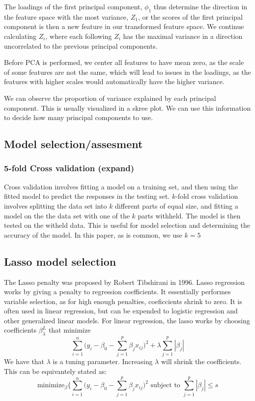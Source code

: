\documentclass[12pt,twoside]{reedthesis}
\theoremstyle{definition}
\theoremstyle{definition}
\theoremstyle{definition}
\theoremstyle{remark}
\begin{document}
The loadings of the first principal component, \(\phi_1\) thus determine
the direction in the feature space with the most variance, \(Z_1\), or
the scores of the first principal component is then a new feature in our
transformed feature space. We continue calculating \(Z_i\), where each
following \(Z_i\) has the maximal variance in a direction uncorrelated
to the previous principal components.

Before PCA is performed, we center all features to have mean zero, as
the scale of some features are not the same, which will lead to issues
in the loadings, as the features with higher scales would automatically
have the higher variance.

We can observe the proportion of variance explained by each principal
component. This is usually visualized in a skree plot. We can use this
information to decide how many principal components to use.

\subsection{Model selection/assesment}\label{model-selectionassesment}

\subsubsection{5-fold Cross validation
(expand)}\label{fold-cross-validation-expand}

Cross validation involves fitting a model on a training set, and then
using the fitted model to predict the responses in the testing set.
\(k\)-fold cross validation involves splitting the data set into \(k\)
different parts of equal size, and fitting a model on the the data set
with one of the \(k\) parts withheld. The model is then tested on the
witheld data. This is useful for model selection and determining the
accuracy of the model. In this paper, as is common, we use \(k = 5\)

\subsection{Lasso model selection}\label{lasso-model-selection}

The Lasso penalty was proposed by Robert Tibshirani in 1996. Lasso
regression works by giving a penalty to regression coefficients. It
essentially performes variable selection, as for high enough penalties,
coeficcients shrink to zero. It is often used in linear regression, but
can be expended to logistic regression and other generalized linear
models. For linear regression, the lasso works by choosing coefficients
\(\beta_\lambda^L\) that minimize
\[ \sum_{i = 1}^n \bigg( y_i - \beta_0 - \sum_{j = 1}^p \beta_jx_{ij}\bigg)^2 + \lambda \sum_{j = 1}^p|\beta_j|\]
We have that \(\lambda\) is a tuning parameter. Increasing \(\lambda\)
will shrink the coefficients. This can be equivantely stated as:
\[ \text{minimize}_\beta \bigg\{\sum_{i = 1}^n\bigg(y_i - \beta_0 - \sum_{j = 1}^p \beta_jx_{ij}\bigg) ^2 \text{ subject to } \sum_{j = 1}^p |\beta_j| \leq s\]
\end{document}
